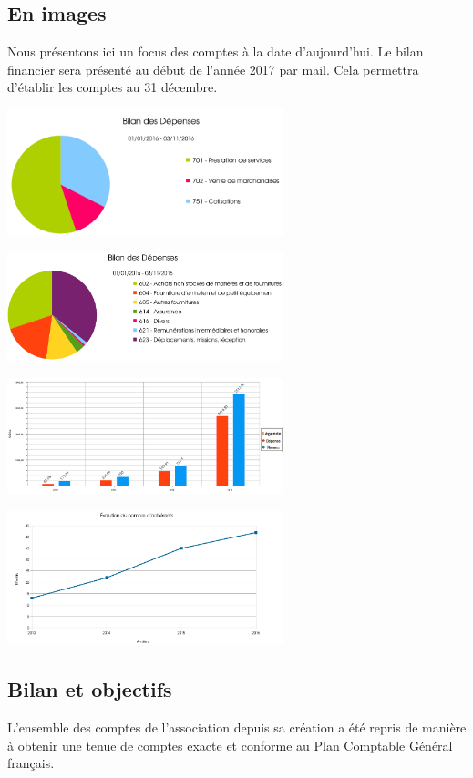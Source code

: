 \documentclass[11pt]{article}
\begin{document}
\subsection{En images}
Nous présentons ici un focus des comptes à la date d'aujourd'hui. Le bilan financier 
sera présenté au début de l'année 2017 par mail. Cela permettra d'établir les comptes 
au 31 décembre.
\begin{center}
\begin{multicols}{2}
\includegraphics[width=8cm]{1DossierAGRecettes.png}

\includegraphics[width=8cm]{2DossierAGDepenses.png}
\end{multicols}

\begin{multicols}{2}
\includegraphics[width=8cm]{3DossierAGGeneral.png}

\includegraphics[width=8cm]{4DossierAGAdherents.png}
\end{multicols}
\end{center}
\subsection{Bilan et objectifs}
L'ensemble des comptes de l'association depuis sa création a été repris de manière 
à obtenir une tenue de comptes exacte et conforme au Plan Comptable Général français.
\end{document}
